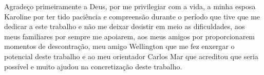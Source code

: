 \begin{agradecimentos}

Agradeço primeiramente a Deus, por me privilegiar com a vida, a minha esposa Karoline por ter tido paciência e compreensão durante o período que tive que me dedicar a este trabalho e não me deixar desistir em meio as dificuldades, aos meus familiares por sempre me apoiarem, aos meus amigos por proporcionarem momentos de descontração, meu amigo Wellington que me fez enxergar o potencial deste trabalho e ao meu orientador Carlos Mar que acreditou que seria possível e muito ajudou na concretização deste trabalho.

\end{agradecimentos}

